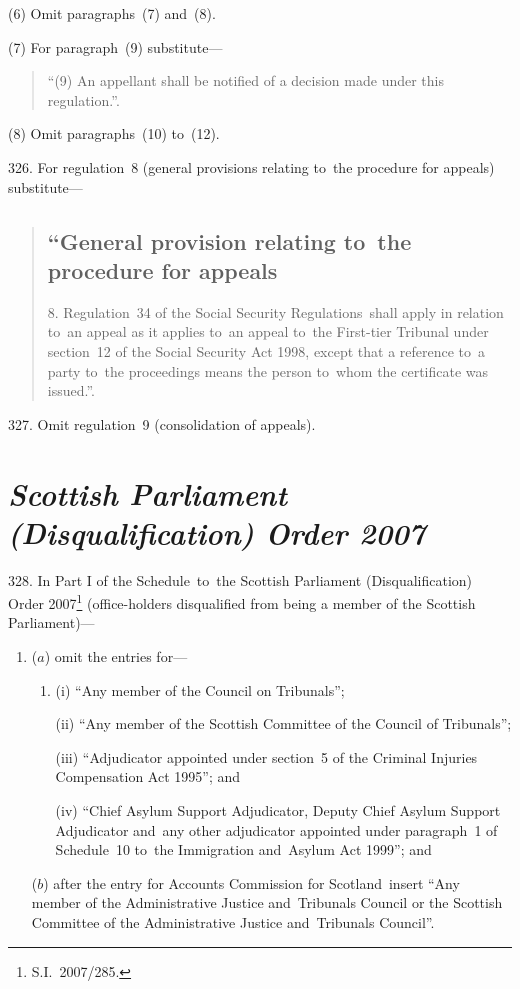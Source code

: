 \documentclass[12pt,a4paper]{article}
\begin{document}
(6) Omit paragraphs~(7) and~(8).

(7) For paragraph~(9) substitute—
\begin{quotation}
“(9) An appellant shall be notified of a decision made under this regulation.”.
\end{quotation}

(8) Omit paragraphs~(10) to~(12).

\medskip

326.  For regulation~8 (general provisions relating to~the procedure for appeals) substitute—
\begin{quotation}
\subsection*{“General provision relating to~the procedure for appeals}

8.  Regulation~34 of the Social Security Regulations~shall apply in relation to~an appeal as it applies to~an appeal to~the First-tier Tribunal under section~12 of the Social Security Act 1998, except that a reference to~a party to~the proceedings means the person to~whom the certificate was issued.”.
\end{quotation}

\medskip

327.  Omit regulation~9 (consolidation of appeals).

\section*{\itshape Scottish Parliament (Disqualification) Order 2007}

328.  In Part I of the Schedule~to~the Scottish Parliament (Disqualification) Order 2007\footnote{S.I.~2007/285.} (office-holders disqualified from being a member of the Scottish Parliament)—
\begin{enumerate}\item[]
($a$) omit the entries for—
\begin{enumerate}\item[]
(i) “Any member of the Council on Tribunals”;

(ii) “Any member of the Scottish Committee of the Council of Tribunals”;

(iii) “Adjudicator appointed under section~5 of the Criminal Injuries Compensation Act 1995”; and

(iv) “Chief Asylum Support Adjudicator, Deputy Chief Asylum Support Adjudicator and~any other adjudicator appointed under paragraph~1 of Schedule~10 to~the Immigration and~Asylum Act 1999”; and
\end{enumerate}

($b$) after the entry for Accounts Commission for Scotland~insert “Any member of the Administrative Justice and~Tribunals Council or the Scottish Committee of the Administrative Justice and~Tribunals Council”.
\end{enumerate}
\end{document}
